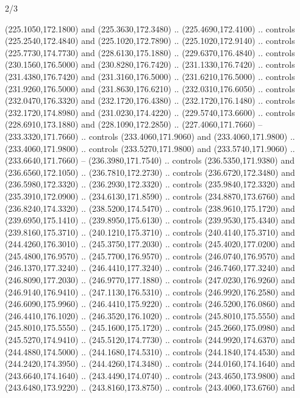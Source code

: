 \begin{flagdescription}{2/3}
\begin{scope}[xshift=0.5\flaglength,yshift=0.5\flagwidth,scale=\flagwidth/259.2]
\begin{scope}[y=0.8pt, x=0.8pt, yscale=-1,shift={(-243,-162)}]
      (225.1050,172.1800) and (225.3630,172.3480) .. (225.4690,172.4100) .. controls
      (225.2540,172.4840) and (225.1020,172.7890) .. (225.1020,172.9140) .. controls
      (225.7730,174.7730) and (228.6130,175.1880) .. (229.6370,176.4840) .. controls
      (230.1560,176.5000) and (230.8280,176.7420) .. (231.1330,176.7420) .. controls
      (231.4380,176.7420) and (231.3160,176.5000) .. (231.6210,176.5000) .. controls
      (231.9260,176.5000) and (231.8630,176.6210) .. (232.0310,176.6050) .. controls
      (232.0470,176.3320) and (232.1720,176.4380) .. (232.1720,176.1480) .. controls
      (232.1720,174.8980) and (231.0230,174.4220) .. (229.5740,173.6600) .. controls
      (228.6910,173.1880) and (228.1090,172.2850) .. (227.4060,171.7660) --
      (233.3320,171.7660) .. controls (233.4060,171.9060) and (233.4060,171.9800) ..
      (233.4060,171.9800) .. controls (233.5270,171.9800) and (233.5740,171.9060) ..
      (233.6640,171.7660) -- (236.3980,171.7540) .. controls (236.5350,171.9380) and
      (236.6560,172.1050) .. (236.7810,172.2730) .. controls (236.6720,172.3480) and
      (236.5980,172.3320) .. (236.2930,172.3320) .. controls (235.9840,172.3320) and
      (235.3910,172.0900) .. (234.6130,171.8590) .. controls (234.8870,173.6760) and
      (236.8240,174.3320) .. (238.5200,174.5470) .. controls (238.9610,175.1720) and
      (239.6950,175.1410) .. (239.8950,175.6130) .. controls (239.9530,175.4340) and
      (239.8160,175.3710) .. (240.1210,175.3710) .. controls (240.4140,175.3710) and
      (244.4260,176.3010) .. (245.3750,177.2030) .. controls (245.4020,177.0200) and
      (245.4800,176.9570) .. (245.7700,176.9570) .. controls (246.0740,176.9570) and
      (246.1370,177.3240) .. (246.4410,177.3240) .. controls (246.7460,177.3240) and
      (246.8090,177.2030) .. (246.9770,177.1880) .. controls (247.0230,176.9260) and
      (246.9140,176.9410) .. (247.1130,176.5310) .. controls (246.9920,176.2580) and
      (246.6090,175.9960) .. (246.4410,175.9220) .. controls (246.5200,176.0860) and
      (246.4410,176.1020) .. (246.3520,176.1020) .. controls (245.8010,175.5550) and
      (245.8010,175.5550) .. (245.1600,175.1720) .. controls (245.2660,175.0980) and
      (245.5270,174.9410) .. (245.5120,174.7730) .. controls (244.9920,174.6370) and
      (244.4880,174.5000) .. (244.1680,174.5310) .. controls (244.1840,174.4530) and
      (244.2420,174.3950) .. (244.4260,174.3480) .. controls (244.0160,174.1640) and
      (243.6640,174.1640) .. (243.4490,174.0740) .. controls (243.4650,173.9800) and
      (243.6480,173.9220) .. (243.8160,173.8750) .. controls (243.4060,173.6760) and

\end{scope}
\end{scope}
\end{flagdescription}
